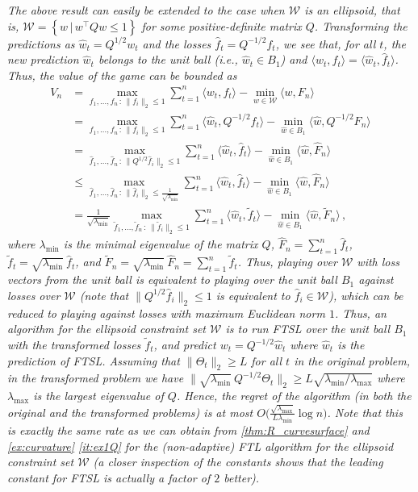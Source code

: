 \documentclass[english]{article}
\newcommand{\cW}{\mathcal{W}}
\newcommand{\seto}[1]{\left\{#1\right\}}
\newcommand{\inpro}[2]{\langle #1, #2\rangle}
\begin{document}
\begin{remark} \em
	The above result can easily be extended to the case when $\cW$ is an ellipsoid, that is, $\cW = \seto{w \,\vert\, w^{\top}Qw \le 1}$ for some positive-definite matrix $Q$. Transforming the predictions as
	$\hat{w}_t = Q^{1/2}w_t$ and the losses $\hat{f}_t=Q^{-1/2} f_t$, we see that, for all $t$, the new prediction $\hat{w}_t$ belongs to the unit ball (i.e., $\hat{w}_t \in B_1$) and 
	$\inpro{w_t}{f_t}=\inpro{\hat{w}_t}{\hat{f}_t}$. Thus, the value of the game can be bounded as
	\begin{align*}
	V_n & = \max_{f_1, \ldots, f_n\,:\, \|f_i\|_2\le 1} \sum_{t=1}^{n}\inpro{w_t}{f_t}- \min_{w\in\cW} \inpro{w}{F_n} \\
	&  = \max_{f_1, \ldots, f_n\,:\, \|f_i\|_2\le 1} \sum_{t=1}^{n} \inpro{\hat{w}_t}{Q^{-1/2}f_t} - \min_{\hat{w}\in B_1} \inpro{\hat{w}}{Q^{-1/2}F_n} \\
	& =  \max_{\hat{f}_1, \ldots, \hat{f}_n\,:\, \|Q^{1/2}\hat{f}_i\|_2\le 1} \sum_{t=1}^{n} \inpro{\hat{w}_t}{\hat{f}_t} - \min_{\hat{w}\in B_1} \inpro{\hat{w}}{\widehat{F}_n} \\
	& \le \max_{\hat{f}_1, \ldots, \hat{f}_n\,:\, \|\hat{f}_i\|_2\le \frac{1}{\sqrt{\lambda_{\min}}}} \sum_{t=1}^{n} \inpro{\hat{w}_t}{\hat{f}_t} - \min_{\hat{w}\in B_1} \inpro{\hat{w}}{\widehat{F}_n} \\
	& = \frac{1}{\sqrt{\lambda_{\min}}} \max_{\tilde{f}_1, \ldots, \tilde{f}_n\,:\, \|\tilde{f}_i\|_2\le 1} \sum_{t=1}^{n} \inpro{\hat{w}_t}{\tilde{f}_t} - \min_{\hat{w}\in B_1} \inpro{\hat{w}}{\tilde{F}_n}\,,
	\end{align*}
	where $\lambda_{\min}$ is the minimal eigenvalue of the matrix $Q$, $\widehat{F}_n=\sum_{t=1}^n \hat{f}_t$, $\tilde{f}_t=\sqrt{\lambda_{\min} }\ \hat{f}_t$, and $\tilde{F}_n=\sqrt{\lambda_{\min} }\  \hat{F}_n=\sum_{t=1}^n \tilde{f}_t$. Thus, playing over $\cW$ with loss vectors from the unit ball is equivalent to playing over the unit ball $B_1$ against losses over $\cW$ (note that $\|Q^{1/2}\hat{f}_i\|_2\le 1$ is equivalent to $\hat{f}_i \in \cW$), which can be reduced to playing against losses with maximum Euclidean norm $1$. Thus, an algorithm for the ellipsoid constraint set $\cW$ is to run FTSL over the unit ball $B_1$ with the transformed losses $\tilde{f}_t$, and predict  $w_t=Q^{-1/2} \hat{w}_t$ where $\hat{w}_t$ is the prediction of FTSL.
	Assuming that $\| \Theta_t \|_2 \ge L$ for all $t$ in the original problem, in the transformed problem we have $\|\sqrt{\lambda_{\min}}\ Q^{-1/2} \Theta_t\|_2 \ge L \sqrt{\lambda_{\min}/\lambda_{\max}}$ where $\lambda_{\max}$ is the largest eigenvalue of $Q$. Hence, the regret of the algorithm (in both the original and the transformed problems) is at most $O\big(\frac{\sqrt{\lambda_{\max}}}{L \lambda_{\min}} \log n \big)$. Note that this is exactly the same rate as we can obtain from \cref{thm:R_curvesurface} and \cref{ex:curvature} \eqref{it:ex1Q} for the (non-adaptive) FTL algorithm for the ellipsoid constraint set $\cW$ (a closer inspection of the constants shows that the leading constant for FTSL is actually a factor of $2$ better).
\end{remark}
\end{document}
